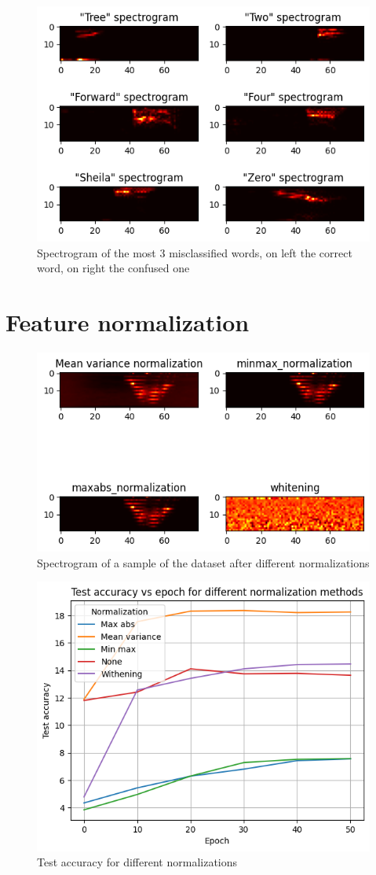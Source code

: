 \documentclass[eng]{class}
\begin{document}
\begin{figure}[h]
  \centering
  \includegraphics[width=.6\columnwidth]{images/misclassified_words.png}
  \caption{Spectrogram of the most 3 misclassified words, on left the correct word, on right the confused one}
  \label{fig-6}
\end{figure}

\section{Feature normalization}
\begin{figure}[h]
  \centering
  \includegraphics[width=.6\columnwidth]{images/normalization_spectrogram.png}
  \caption{Spectrogram of a sample of the dataset after different normalizations}
  \label{fig-7}
\end{figure}

\begin{figure}[h]
  \centering
  \includegraphics[width=.6\columnwidth]{images/test_diff_normalizations.png}
  \caption{Test accuracy for different normalizations}
  \label{fig-8}
\end{figure}
\end{document}
